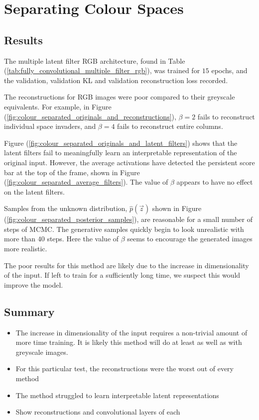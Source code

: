 \clearpage
%
%
%
%
%
\section{Separating Colour Spaces}

\subsection{Results}
The multiple latent filter RGB architecture, found in Table (\ref{tab:fully_convolutional_multiple_filter_rgb}), was trained for $15$ epochs, and the validation, validation KL and validation reconstruction loss recorded.

The reconstructions for RGB images were poor compared to their greyscale equivalents. For example, in Figure (\ref{fig:colour_separated_originals_and_reconstructions}), $\beta = 2$ fails to reconstruct individual space invaders, and $\beta = 4$ fails to reconstruct entire columns.

Figure (\ref{fig:colour_separated_originals_and_latent_filters}) shows that the latent filters fail to meaningfully learn an interpretable representation of the original input. However, the average activations have detected the persistent score bar at the top of the frame, shown in Figure (\ref{fig:colour_separated_average_filters}). The value of $\beta$ appears to have no effect on the latent filters.

Samples from the unknown distribution, $\hat{p}(\vec{z})$ shown in Figure (\ref{fig:colour_separated_posterior_samples}), are reasonable for a small number of steps of MCMC. The generative samples quickly begin to look unrealistic with more than $40$ steps. Here the value of $\beta$ seems to encourage the generated images more realistic.

The poor results for this method are likely due to the increase in dimensionality of the input. If left to train for a sufficiently long time, we suspect this would improve the model.

\subsection{Summary}

\begin{itemize}
\item The increase in dimensionality of the input requires a non-trivial amount of more time training. It is likely this method will do at least as well as with greyscale images.
\item For this particular test, the reconstructions were the worst out of every method
\item The method struggled to learn interpretable latent representations
\item Show reconstructions and convolutional layers of each
\end{itemize}




